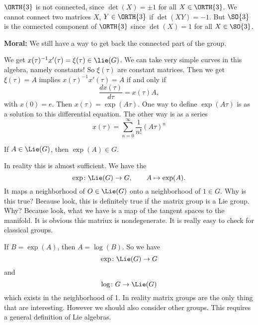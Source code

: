 \begin{ex}
$\ORTH{3}$ is not connected, since $\det(X)=\pm1$ for all
  $X\in\ORTH{3}$. We cannot connect two matrices $X$, $Y\in\ORTH{3}$ if
  $\det(XY)=-1$. But $\SO{3}$ is the connected component of
  $\ORTH{3}$ since $\det(X)=1$ for all $X\in\SO{3}$.
\end{ex}

\medbreak
\noindent\textbf{Moral:} We still have a way to get back the
connected part of the group.
\medbreak

We get $x(\tau)^{-1}x'(\tau)=\xi(\tau)\in\lie(G)$. We can take
very simple curves in this algebra, namely constants! So
$\xi(\tau)$ are constant matrices. Then we get $\xi(\tau)=A$
implies $x(\tau)^{-1}x'(\tau)=A$ if and only if
\begin{equation}
\frac{dx(\tau)}{d\tau}=x(\tau)A,
\end{equation}
with $x(0)=e$. Then $x(\tau)=\exp(A\tau)$. One way to define
$\exp(A\tau)$ is as a solution to this differential equation. The
other way is as a series
\begin{equation}
x(\tau)=\sum^{\infty}_{n=0}\frac{1}{n!}(A\tau)^{n}
\end{equation}

\begin{cor}
If $A\in\Lie(G)$, then $\exp(A)\in G$.
\end{cor}
\medbreak

In reality this is almost sufficient. We have the
\begin{equation}
\exp\colon\Lie(G)\to G,\qquad A\mapsto\exp(A).
\end{equation}
It maps a neighborhood of $O\in\Lie(G)$ onto a neighborhood of
$1\in G$. Why is this true? Because look, this is definitely true
if the matrix group is a Lie group. Why? Because look, what we
have is a map of the tangent spaces to the manifold. It is
obvious this matriux is nondegenerate. It is really easy to check
for classical groups.

If $B=\exp(A)$, then $A=\log(B)$. So we have
\begin{equation}
\exp\colon\Lie(G)\to G
\end{equation}
and 
\begin{equation}
\log\colon G\to\Lie(G)
\end{equation}
which exists in the neighborhood of 1. In reality matrix groups
are the only thing that are interesting. However we should also
consider other groups. This requires a general definition of Lie
algebras. 

